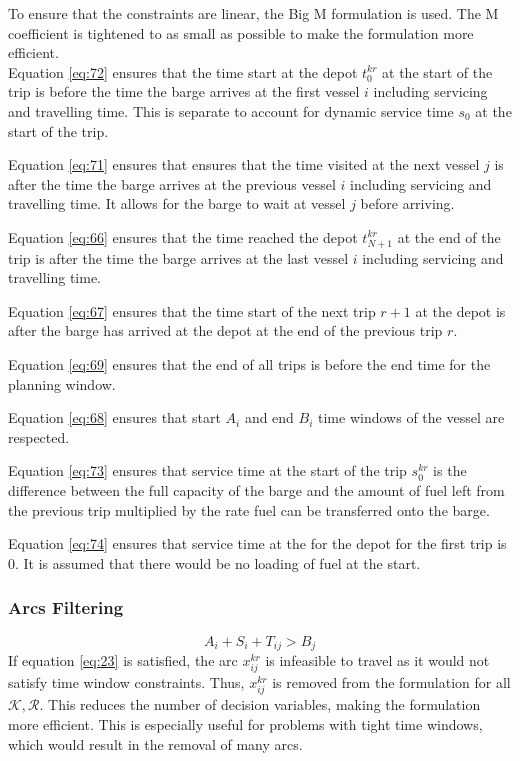 To ensure that the constraints are linear, the Big M formulation is used. The M coefficient is tightened to as small as possible to make the formulation more efficient.  \\

Equation \ref{eq:72} ensures that the time start at the depot $t_{0}^{kr}$ at the start of the trip is before the time the barge arrives at the first vessel $i$ including servicing and travelling time. This is separate to account for dynamic service time $s_{0}$ at the start of the trip.

Equation \ref{eq:71} ensures that ensures that the time visited at the next vessel $j$ is after the time the barge arrives at the previous vessel $i$ including servicing and travelling time. It allows for the barge to wait at vessel $j$ before arriving.

Equation \ref{eq:66} ensures that the time reached the depot $t_{N+1}^{kr}$ at the end of the trip is after the time the barge arrives at the last vessel $i$ including servicing and travelling time.

Equation \ref{eq:67} ensures that the time start of the next trip $r+1$ at the depot is after the barge has arrived at the depot at the end of the previous trip $r$.

Equation \ref{eq:69} ensures that the end of all trips is before the end time for the planning window.

Equation \ref{eq:68} ensures that start $A_i$ and end $B_i$ time windows of the vessel are respected.

Equation \ref{eq:73} ensures that service time at the start of the trip $s_{0}^{kr}$ is the difference between the full capacity of the barge and the amount of fuel left from the previous trip multiplied by the rate fuel can be transferred onto the barge.

Equation \ref{eq:74} ensures that service time at the for the depot for the first trip is 0. It is assumed that there would be no loading of fuel at the start.

\subsubsection{Arcs Filtering}
\begin{equation} \label{eq:23}
A_{i} + S_{i} +T_{ij} > B_{j}
\end{equation}
If equation \ref{eq:23} is satisfied, the arc $x_{ij}^{kr}$ is infeasible to travel as it would not satisfy time window constraints. Thus, $x_{ij}^{kr}$ is removed from the formulation for all $\mathcal{K}, \mathcal{R}$. This reduces the number of decision variables, making the formulation more efficient. This is especially useful for problems with tight time windows, which would result in the removal of many arcs.
 

